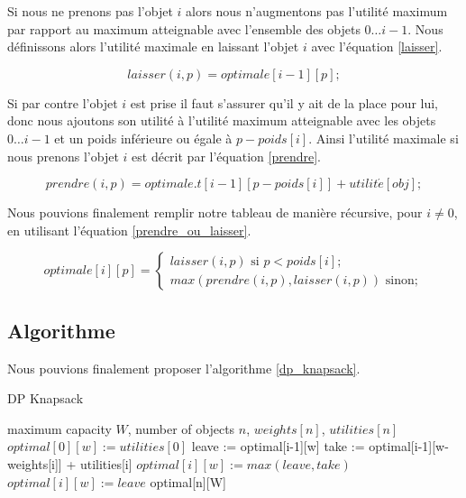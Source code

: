 Si nous ne prenons pas l'objet $i$ alors nous n'augmentons pas l'utilité maximum par rapport au maximum atteignable avec l'ensemble des objets $0 \dots i-1$. Nous définissons alors l'utilité maximale en laissant l'objet $i$ avec l'équation \ref{laisser}.

\begin{equation}
\label{laisser}
laisser(i, p) = optimale[i-1][p];
\end{equation}


Si par contre l'objet $i$ est prise il faut s'assurer qu'il y ait de la place pour lui, donc nous ajoutons son utilité à l'utilité maximum atteignable avec les objets $0 \dots i-1$ et un poids inférieure ou égale à $p-poids[i]$. Ainsi l'utilité maximale si nous prenons l'objet $i$ est décrit par l'équation \ref{prendre}.

\begin{equation}
\label{prendre}
prendre(i, p) = optimale.t[i-1][p - poids[i]] + utilit\acute{e}[obj];
\end{equation}

Nous pouvions finalement remplir notre tableau de manière récursive, pour $i \neq 0$, en utilisant l'équation \ref{prendre_ou_laisser}.

\begin{equation}
\label{prendre_ou_laisser}
optimale[i][p] =
	\begin{cases}
		laisser(i, p) \text{ si } p < poids[i];	\\
		max(prendre(i, p), laisser(i, p)) \text{ sinon};
	\end{cases}
\end{equation}


\subsection{Algorithme}

Nous pouvions finalement proposer l'algorithme \ref{dp_knapsack}.

\begin{algorithm}[!ht]
\caption{DP Knapsack}
\label{dp_knapsack}
\begin{algorithmic}[1]
\REQUIRE maximum capacity $W$, number of objects $n$, $weights[n]$, $utilities[n]$  
		\STATE $optimal[0][w] := utilities[0]$
	\ENDIF
\ENDFOR
{}
		\STATE leave := optimal[i-1][w]
		\STATE take := optimal[i-1][w-weights[i]] + utilities[i]
			\STATE $optimal[i][w] := max(leave, take)$
		\ELSE
			\STATE $optimal[i][w] := leave$
		\ENDIF
	\ENDFOR
\ENDFOR
\RETURN optimal[n][W]
\end{algorithmic}
\end{algorithm}

